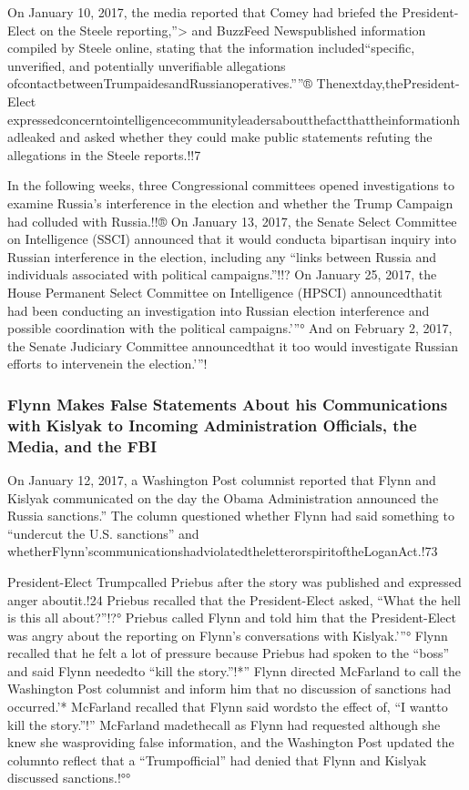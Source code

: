 On January 10, 2017, the media reported that Comey had briefed the President-Elect on the Steele reporting,''> and BuzzFeed Newspublished information compiled by Steele online, stating that the information included“specific, unverified, and potentially unverifiable allegations ofcontactbetweenTrumpaidesandRussianoperatives.”''® Thenextday,thePresident-Elect expressedconcerntointelligencecommunityleadersaboutthefactthattheinformationhadleaked and asked whether they could make public statements refuting the allegations in the Steele reports.!!7

In the following weeks, three Congressional committees opened investigations to examine Russia’s interference in the election and whether the Trump Campaign had colluded with Russia.!!® On January 13, 2017, the Senate Select Committee on Intelligence (SSCI) announced that it would conducta bipartisan inquiry into Russian interference in the election, including any “links between Russia and individuals associated with political campaigns.”!!? On January 25, 2017, the House Permanent Select Committee on Intelligence (HPSCI) announcedthatit had been conducting an investigation into Russian election interference and possible coordination with the political campaigns.'”° And on February 2, 2017, the Senate Judiciary Committee announcedthat it too would investigate Russian efforts to intervenein the election.'”!


\subsubsection{Flynn Makes False Statements About his Communications with Kislyak to Incoming Administration Officials, the Media, and the FBI}

On January 12, 2017, a Washington Post columnist reported that Flynn and Kislyak communicated on the day the Obama Administration announced the Russia sanctions.” The column questioned whether Flynn had said something to “undercut the U.S. sanctions” and whetherFlynn’scommunicationshadviolatedtheletterorspiritoftheLoganAct.!73

President-Elect Trumpcalled Priebus after the story was published and expressed anger aboutit.!24 Priebus recalled that the President-Elect asked, “What the hell is this all about?”!?° Priebus called Flynn and told him that the President-Elect was angry about the reporting on Flynn’s conversations with Kislyak.'”° Flynn recalled that he felt a lot of pressure because Priebus had spoken to the “boss” and said Flynn neededto “kill the story.”!*” Flynn directed McFarland to call the Washington Post columnist and inform him that no discussion of sanctions had occurred.'* McFarland recalled that Flynn said wordsto the effect of, “I wantto kill the story.”!” McFarland madethecall as Flynn had requested although she knew she wasproviding false information, and the Washington Post updated the columnto reflect that a “Trumpofficial” had denied that Flynn and Kislyak discussed sanctions.!°°

